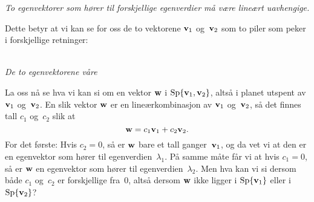 \smallskip
\noindent\emph{To egenvektorer som hører til forskjellige egenverdier
  må være lineært uavhengige.}
\smallskip

Dette betyr at vi kan se for oss de to vektorene $\mathbf{v}_1$
og~$\mathbf{v}_2$ som to piler som peker i forskjellige retninger:
\begin{center}
\\
{\small \textit{De to egenvektorene våre}}
\end{center}

La oss nå se hva vi kan si om en vektor $\mathbf{w}$ i
$\operatorname{Sp} \{ \mathbf{v}_1, \mathbf{v}_2 \}$, altså i planet utspent av $\mathbf{v}_1$
og~$\mathbf{v}_2$.  En slik vektor $\mathbf{w}$ er en lineærkombinasjon av
$\mathbf{v}_1$ og~$\mathbf{v}_2$, så det finnes tall $c_1$ og~$c_2$ slik at
\[
\mathbf{w} = c_1 \mathbf{v}_1 + c_2 \mathbf{v}_2.
\]
For det første: Hvis $c_2 = 0$, så er $\mathbf{w}$ bare et tall
ganger~$\mathbf{v}_1$, og da vet vi at den er en egenvektor som hører til
egenverdien~$\lambda_1$.  På samme måte får vi at hvis $c_1 = 0$, så
er $\mathbf{w}$ en egenvektor som hører til egenverdien~$\lambda_2$.  Men
hva kan vi si dersom både $c_1$ og~$c_2$ er forskjellige fra~$0$,
altså dersom $\mathbf{w}$ ikke ligger i $\operatorname{Sp} \{\mathbf{v}_1\}$ eller i
$\operatorname{Sp} \{\mathbf{v}_2\}$?

